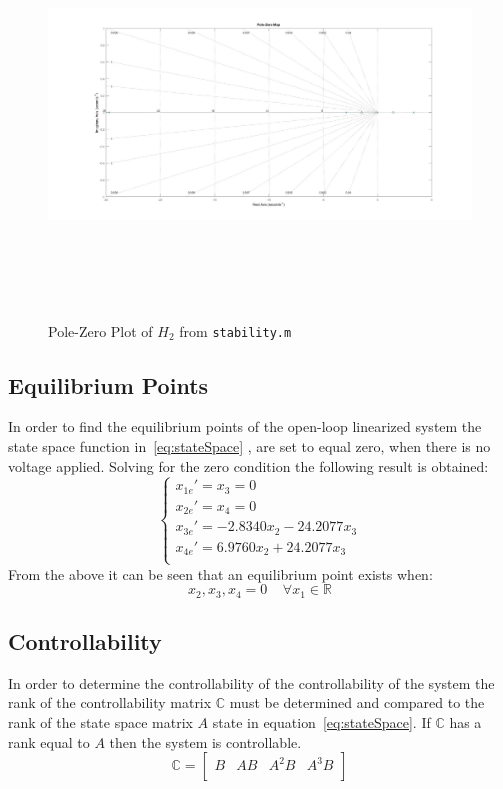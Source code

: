 \documentclass[12pt]{article} %
\begin{document}
\begin{figure}[h] 
\caption{Pole-Zero Plot of $H_2$ from \texttt{stability.m}}
\includegraphics[height=10cm, width = 17cm]{h2fig.jpg}
\label{fig:pz2}
\centering
\end{figure}
\subsection{Equilibrium Points} \label{sec:eqp}
In order to find the equilibrium points of the open-loop linearized system the state space function in~\ref{eq:stateSpace} , are set to equal zero, when there is no voltage applied. Solving for the zero condition the following result is obtained: 
\begin{equation} \label{eq:eqp}
\begin{cases}
x_{1e}' = x_3 = 0 \\
x_{2e}' = x_4 = 0 \\
x_{3e}' = -2.8340x_2 - 24.2077x_3\\
x_{4e}' = 6.9760x_2 +24.2077x_3\\
\end{cases}
\end{equation}
From the above it can be seen that an equilibrium point exists when:
\begin{equation}
x_2,x_3,x_4 = 0 \; \; \; \; \forall x_1 \in \mathbb{R}
\end{equation}
\subsection{Controllability}
In order to determine the controllability of the controllability of the system the rank of the controllability matrix $\mathbb{C}$ must be determined and compared to the rank of the state space matrix $A$ state in equation~\ref{eq:stateSpace}. If $\mathbb{C}$ has a rank equal to $A$ then the system is controllable. 
\begin{equation}
\mathbb{C} = 
\begin{bmatrix}
B & AB & A^2B & A^3B \\
\end{bmatrix}
\end{equation}
\end{document}
